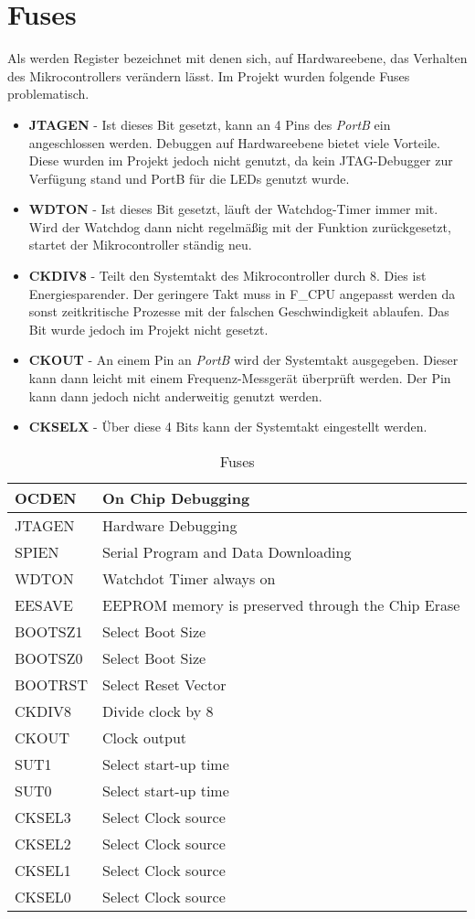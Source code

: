 \section{Fuses}
\label{sec:Fuses}
Als  werden Register bezeichnet mit denen sich, auf Hardwareebene, das Verhalten des Mikrocontrollers verändern lässt. Im Projekt wurden folgende Fuses problematisch.
\begin{itemize}
\item \textbf{JTAGEN} - Ist dieses Bit gesetzt, kann an 4 Pins des \emph{PortB} ein  angeschlossen werden. Debuggen auf Hardwareebene bietet viele Vorteile. Diese wurden im Projekt jedoch nicht genutzt, da kein JTAG-Debugger zur Verfügung stand und PortB für die LEDs genutzt wurde.
\item \textbf{WDTON} - Ist dieses Bit gesetzt, läuft der Watchdog-Timer immer mit. Wird der Watchdog dann nicht regelmäßig mit der Funktion  zurückgesetzt, startet der Mikrocontroller ständig neu. 
\item \textbf{CKDIV8} - Teilt den Systemtakt des Mikrocontroller durch 8. Dies ist Energiesparender. Der geringere Takt muss in F\_CPU angepasst werden da sonst zeitkritische Prozesse mit der falschen Geschwindigkeit ablaufen. Das Bit wurde jedoch im Projekt nicht gesetzt.
\item \textbf{CKOUT} - An einem Pin an \emph{PortB} wird der Systemtakt ausgegeben. Dieser kann dann leicht mit einem Frequenz-Messgerät überprüft werden. Der Pin kann dann jedoch nicht anderweitig genutzt werden.
\item \textbf{CKSELX} - Über diese 4 Bits kann der Systemtakt eingestellt werden.
\end{itemize}
\begin{longtable}{|l|l|} 
\caption{Fuses} \\
\hline
\label{tab:Fuses}
OCDEN & On Chip Debugging \\ \hline 
JTAGEN & Hardware Debugging \\ \hline 
SPIEN & Serial Program and Data Downloading \\ \hline 
WDTON & Watchdot Timer always on \\ \hline 
EESAVE & EEPROM memory is preserved through the Chip Erase \\ \hline 
BOOTSZ1 & Select Boot Size \\ \hline 
BOOTSZ0 & Select Boot Size \\ \hline 
BOOTRST & Select Reset Vector \\ \hline 
CKDIV8 & Divide clock by 8 \\ \hline 
CKOUT & Clock output \\ \hline 
SUT1 & Select start-up time \\ \hline 
SUT0 & Select start-up time \\ \hline 
CKSEL3 & Select Clock source \\ \hline 
CKSEL2 & Select Clock source \\ \hline 
CKSEL1 & Select Clock source \\ \hline 
CKSEL0 & Select Clock source \\ \hline 
\end{longtable} 
